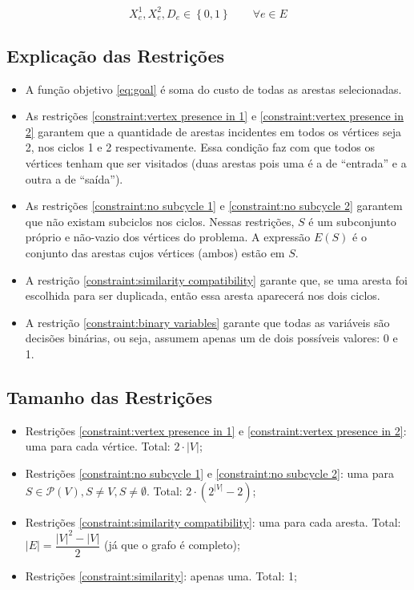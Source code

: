 \documentclass{article}
\newcommand{\Set}[1]{\ensuremath{\left\{#1\right\}}}
\newcommand{\partsof}[1]{\ensuremath{\mathcal{P}\left(#1\right)}}
\newcommand{\abs}[1]{\ensuremath{\left| #1 \right|}}
\newcommand{\binary}{\ensuremath{\Set{0, 1}}}
\newcommand{\edge}{\ensuremath{e}}
\newcommand{\edges}{\ensuremath{E}}
\newcommand{\vertices}{\ensuremath{V}}
\newcommand{\subvertices}{\ensuremath{S}}
\newcommand{\xoe}{\ensuremath{X^{1}_{\edge}}}
\newcommand{\xte}{\ensuremath{X^{2}_{\edge}}}
\newcommand{\de}{\ensuremath{D_{\edge}}}
\begin{document}
\begin{equation}
	\label{constraint:binary variables}
	\xoe, \xte, \de \in \binary
	\qquad
	\forall \edge \in \edges
\end{equation}

\subsection{Explicação das Restrições}

\begin{itemize}
    \item A função objetivo \eqref{eq:goal} é soma do custo de todas as arestas selecionadas.
    \item As restrições \eqref{constraint:vertex presence in 1} e \eqref{constraint:vertex presence in 2} garantem que a quantidade de arestas incidentes em todos os vértices seja 2, nos ciclos 1 e 2 respectivamente. Essa condição faz com que todos os vértices tenham que ser visitados (duas arestas pois uma é a de ``entrada'' e a outra a de ``saída'').
    \item As restrições \eqref{constraint:no subcycle 1} e \eqref{constraint:no subcycle 2} garantem que não existam subciclos nos ciclos. Nessas restrições, $\subvertices$ é um subconjunto próprio e não-vazio dos vértices do problema. A expressão $\edges(\subvertices)$ é o conjunto das arestas cujos vértices (ambos) estão em $\subvertices$.
    \item A restrição \eqref{constraint:similarity compatibility} garante que, se uma aresta foi escolhida para ser duplicada, então essa aresta aparecerá nos dois ciclos.
    \item A restrição \eqref{constraint:binary variables} garante que todas as variáveis são decisões binárias, ou seja, assumem apenas um de dois possíveis valores: 0 e 1.
\end{itemize}

\subsection{Tamanho das Restrições}

\begin{itemize}
	\item Restrições \eqref{constraint:vertex presence in 1} e \eqref{constraint:vertex presence in 2}: uma para cada vértice. Total: $2 \cdot \abs{\vertices}$;
	\item Restrições \eqref{constraint:no subcycle 1} e \eqref{constraint:no subcycle 2}: uma para $\subvertices \in \partsof{\vertices}, \subvertices \neq \vertices, \subvertices \neq \emptyset$. Total: $2 \cdot \left( 2^{\abs{\vertices}} - 2\right)$;
	\item Restrições \eqref{constraint:similarity compatibility}: uma para cada aresta. Total: $\abs{\edges} = \dfrac{\abs{\vertices}^2 - \abs{\vertices}}{2}$ (já que o grafo é completo);
	\item Restrições \ref{constraint:similarity}: apenas uma. Total: 1;
\end{itemize}
\end{document}

